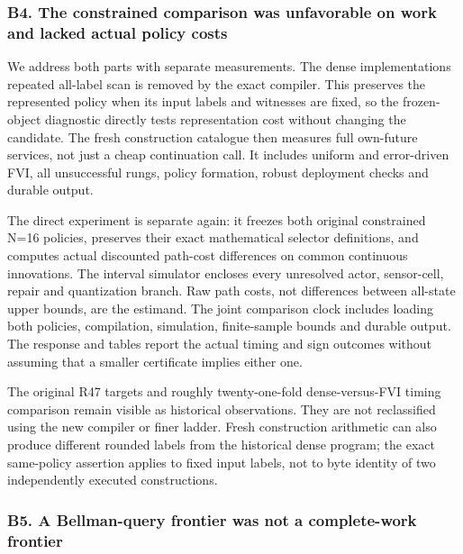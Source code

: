 \documentclass[ecta,nameyear,draft]{econsocart}
\begin{document}
\hypertarget{b4-the-constrained-comparison-was-unfavorable-on-work-and-lacked-actual-policy-costs}{%
\subsubsection{B4. The constrained comparison was unfavorable on work
and lacked actual policy
costs}\label{b4-the-constrained-comparison-was-unfavorable-on-work-and-lacked-actual-policy-costs}}

We address both parts with separate measurements. The dense
implementation\textquotesingle s repeated all-label scan is removed by
the exact compiler. This preserves the represented policy when its input
labels and witnesses are fixed, so the frozen-object diagnostic directly
tests representation cost without changing the candidate. The fresh
construction catalogue then measures full own-future services, not just
a cheap continuation call. It includes uniform and error-driven FVI, all
unsuccessful rungs, policy formation, robust deployment checks and
durable output.

The direct experiment is separate again: it freezes both original
constrained N=16 policies, preserves their exact mathematical selector
definitions, and computes actual discounted path-cost differences on
common continuous innovations. The interval simulator encloses every
unresolved actor, sensor-cell, repair and quantization branch. Raw path
costs, not differences between all-state upper bounds, are the estimand.
The joint comparison clock includes loading both policies, compilation,
simulation, finite-sample bounds and durable output. The response and
tables report the actual timing and sign outcomes without assuming that
a smaller certificate implies either one.

The original R47 targets and roughly twenty-one-fold dense-versus-FVI
timing comparison remain visible as historical observations. They are
not reclassified using the new compiler or finer ladder. Fresh
construction arithmetic can also produce different rounded labels from
the historical dense program; the exact same-policy assertion applies to
fixed input labels, not to byte identity of two independently executed
constructions.

\hypertarget{b5-a-bellman-query-frontier-was-not-a-complete-work-frontier}{%
\subsubsection{B5. A Bellman-query frontier was not a complete-work
frontier}\label{b5-a-bellman-query-frontier-was-not-a-complete-work-frontier}}
\end{document}
